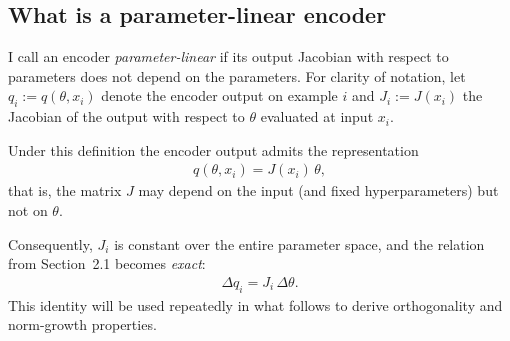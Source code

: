 \subsection{What is a parameter-linear encoder}

I call an encoder \emph{parameter-linear} if its output Jacobian with respect to parameters does not depend on the parameters. For clarity of notation, let
\( q_i := q(\theta, x_i) \) denote the encoder output on example $i$ and
\( J_i := J(x_i) \) the Jacobian of the output with respect to $\theta$ evaluated at input $x_i$.

Under this definition the encoder output admits the representation
\begin{align}
q(\theta, x_i) = J(x_i)\,\theta, \label{eq:param-linear-def}
\end{align}
that is, the matrix $J$ may depend on the input (and fixed hyperparameters) but not on $\theta$.

Consequently, $J_i$ is constant over the entire parameter space, and the relation from Section~2.1 becomes \emph{exact}:
\begin{align}
\Delta q_i = J_i\,\Delta\theta. \label{eq:exact-delta-q}
\end{align}
This identity will be used repeatedly in what follows to derive orthogonality and norm-growth properties.


